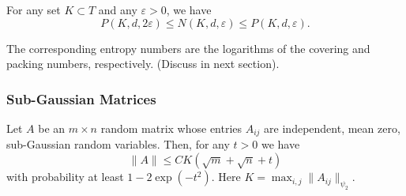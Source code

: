 \begin{lem}
For any set $K \subset T$ and any $\varepsilon > 0$, we have
\[
P(K, d, 2\varepsilon) \leq N(K, d, \varepsilon) \leq P(K, d, \varepsilon).
\]
\end{lem}

\begin{rem}
    The corresponding entropy numbers are the logarithms of the covering and packing numbers, respectively. (Discuss in next section).
\end{rem}

\subsubsection{Sub-Gaussian Matrices}
\begin{thm}
Let $A$ be an $m \times n$ random matrix whose entries $A_{ij}$ are independent, mean zero, sub-Gaussian random variables. Then, for any $t > 0$ we have
\[
\|A\| \leq C K (\sqrt{m} + \sqrt{n} + t)
\]
with probability at least $1 - 2 \exp(-t^2)$. Here $K = \max_{i,j} \|A_{ij}\|_{\psi_2}$.
\end{thm}

